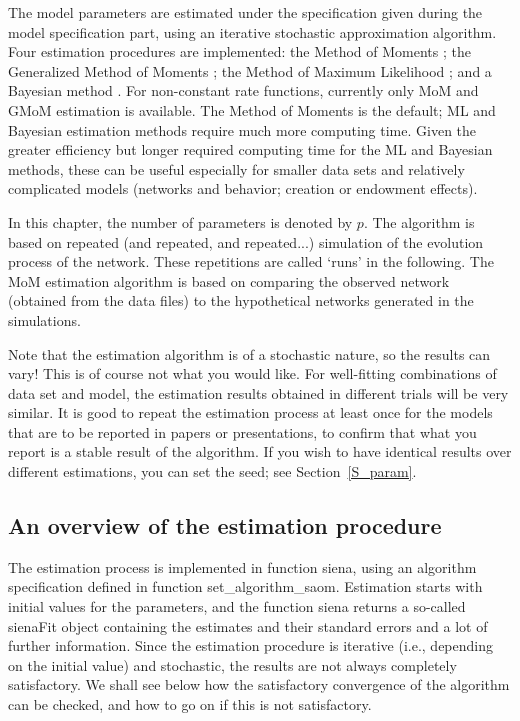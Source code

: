 \documentclass[a4paper,fleqn,11pt]{article}
\newcommand{\+}{\, + \,}
\begin{document}
The model parameters are estimated under the specification given
during the model specification part, using an iterative stochastic
approximation algorithm.
Four estimation procedures are implemented:
the Method of Moments \citep*[`MoM';][]{Snijders01, SnijdersEA07};
the Generalized Method of Moments \citep*[`GMoM';][]{ASS2015,ASS2019};
 the Method of Maximum Likelihood \citep[`ML';][]{SnijdersEA10a};
 and a Bayesian method
 \citep{Koskinen04, KoskinenSnijders07,SchweinbergerSnijders07c}.
 For non-constant rate functions, currently only
 MoM and GMoM estimation is available.
 The Method of Moments is the default;
 ML and Bayesian estimation methods require much more computing time.
 Given the greater efficiency but longer required computing time
 for the ML and Bayesian methods,
 these can be useful especially for smaller data sets
 and relatively complicated models
 (networks and behavior; creation or endowment effects).

In this chapter, the number of
parameters is denoted by $p$. The algorithm is based on repeated
(and repeated, and repeated...) simulation of the evolution
process of the network. These repetitions are called `runs' in the
following. The MoM estimation algorithm is based on comparing the
observed network (obtained from the data files)
to the hypothetical networks generated in the simulations.

Note that the estimation algorithm is of a stochastic nature, so
the results can vary! This is of course not what you would like.
For well-fitting combinations of data set and model, the
estimation results obtained in different trials will be very
similar. It is good to repeat the estimation process at least once
for the models that are to be reported in papers or presentations,
to confirm that what you report is a stable result of the algorithm.
If you wish to have identical results over different estimations,
you can set the seed; see Section~\ref{S_param}.

\subsection{An overview of the estimation procedure}
\hypertarget{T_S_options}{   }

The estimation process is implemented in function \textsf{siena},
using an algorithm specification defined in function \textsf{set\_algorithm\_saom}.
Estimation starts with initial values for the parameters,
and the function \textsf{siena} returns a
so-called \textsf{sienaFit} object containing the estimates and their standard errors and
a lot of further information.
Since the estimation procedure is iterative (i.e., depending on the
initial value) and stochastic,
the results are not always completely satisfactory. We shall see below
how the satisfactory convergence of the algorithm can be checked,
and how to go on if this is not satisfactory.
\end{document}
